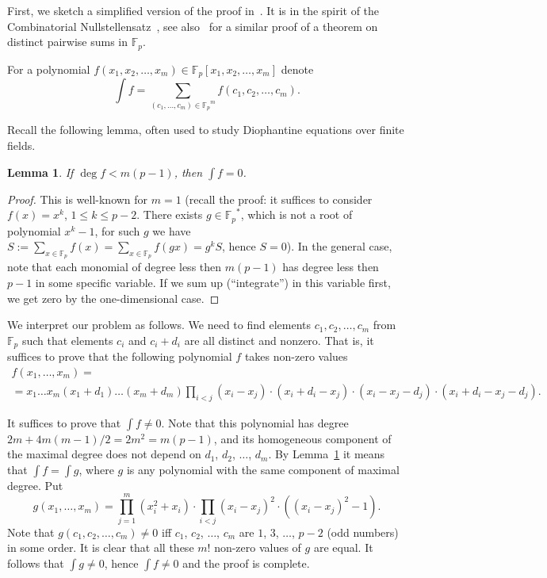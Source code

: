 \documentclass[12pt,a4paper]{amsart}
\newtheorem{lem}{Lemma}
\theoremstyle{definition}
\theoremstyle{remark}
\begin{document}
First, we sketch a simplified version of the proof in~\cite{pm2009}. It is in the spirit of the Combinatorial Nullstellensatz~\cite{alon1999}, see also~\cite{alon2000} for a similar proof of a theorem on distinct pairwise sums in ${{\mathbb F_p}}$.

For a polynomial $f(x_1,x_2,\dots,x_m)\in {{\mathbb F_p}} [x_1,x_2,\dots,x_m]$ denote
$$
\int f=\sum_{(c_1,\dots,c_m)\in {{\mathbb F_p}}^m} f(c_1,c_2,\dots,c_m).
$$

Recall the following lemma, often used to study Diophantine equations over finite fields.

\begin{lem}
\label{average-p}
If $\deg f<m(p-1)$, then $\int f=0$.
\end{lem}

\begin{proof}
This is well-known for $m=1$ (recall the proof: it suffices to consider $f(x)=x^k$, $1\leq k\leq p-2$. There exists $g\in {{\mathbb F_p}}^*$, which is not a root of polynomial $x^k-1$, for such $g$ we have $S:=\sum_{x\in {{\mathbb F_p}}} f(x)=\sum_{x\in {{\mathbb F_p}}} f(gx)=g^k S$, hence $S=0$). In the general case, note that each monomial of degree
less then $m(p-1)$ has degree less then $p-1$ in some specific variable. If we sum up (``integrate'') in this variable first, we get zero by the one-dimensional case.
\end{proof}

We interpret our problem as follows. We need to find elements $c_1,c_2,\dots,c_m$ from ${{\mathbb F_p}}$ such that elements $c_i$ and $c_i+d_i$ are all distinct and nonzero. That is, it suffices to prove that the following polynomial $f$ takes non-zero values
\begin{multline*}
f(x_1,\dots,x_m)=\\=x_1\dots x_m(x_1+d_1)\dots(x_m+d_m)
\prod_{i<j} (x_i-x_j)\cdot (x_i+d_i-x_j)\cdot (x_i-x_j-d_j)\cdot (x_i+d_i-x_j-d_j).
\end{multline*}

It suffices to prove that $\int f\ne 0$. Note that this polynomial has degree $2m+4m(m-1)/2=2m^2=m(p-1)$, and its homogeneous component of the maximal degree does not depend on $d_1$, $d_2$, $\dots$, $d_m$. By Lemma~\ref{average-p} it means that $\int f=\int g$, where $g$ is any polynomial with the
same component of maximal degree. Put
$$
g(x_1,\dots,x_m)= \prod_{j=1}^m (x_i^2+x_i) \cdot \prod_{i<j} (x_i-x_j)^2\cdot ((x_i-x_j)^2-1).
$$
Note that $g(c_1,c_2,\dots,c_m)\ne 0$ iff $c_1$, $c_2$, $\dots$, $c_m$
are $1$, $3$, $\dots$, $p-2$ (odd numbers) in some order. It is clear that all these $m!$ non-zero
values of $g$ are equal. It follows that $\int g\ne 0$, hence $\int f\ne 0$ and the proof is complete.
\end{document}

